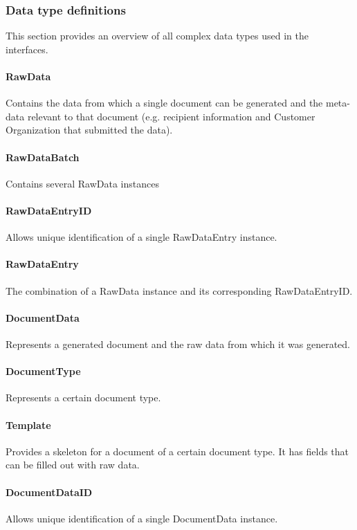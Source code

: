 \documentclass[a4paper,10pt]{article}
\begin{document}
\subsubsection{Data type definitions}
This section provides an overview of all complex data types used in the interfaces.

\paragraph{RawData} Contains the data from which a single document can be generated and the meta-data relevant to that document (e.g. recipient information and Customer Organization that submitted the data).

\paragraph{RawDataBatch} Contains several RawData instances

\paragraph{RawDataEntryID} Allows unique identification of a single RawDataEntry instance.

\paragraph{RawDataEntry} The combination of a RawData instance and its corresponding RawDataEntryID.

\paragraph{DocumentData} Represents a generated document and the raw data from which it was generated.

\paragraph{DocumentType} Represents a certain document type.

\paragraph{Template} Provides a skeleton for a document of a certain document type. It has fields that can be filled out with raw data.

\paragraph{DocumentDataID} Allows unique identification of a single DocumentData instance.
\end{document}
